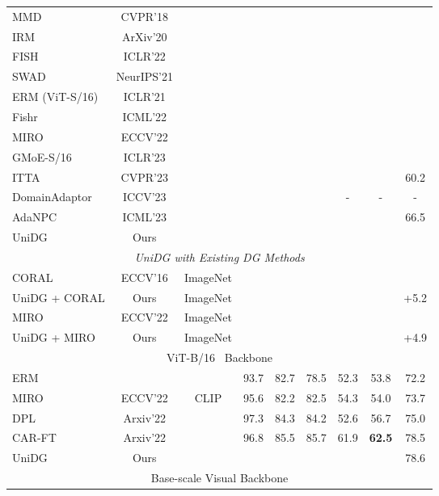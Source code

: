 \documentclass{article} \usepackage{iclr2024_conference,times}
\def\Model{UniDG }
\begin{document}
\begin{table*}[t]
{\begin{tabular}{l|c|c|cccccc}
			MMD~\citep{li2018domain} & CVPR'18 & &  &  &  &  &   &  \\
			IRM ~\citep{arjovsky2019invariant} & ArXiv'20 &  &  &  &  &  &   &  \\
			FISH~\citep{shi2021gradient} & ICLR'22 &  &  &  &  &  &  &  \\
			SWAD~\citep{cha2021swad} & NeurIPS'21 &  &  &  &  &  &   &   \\
			ERM (ViT-S/16)~\citep{dosovitskiy2020image} & ICLR'21 &  &  &  &  &  &   &  \\
			Fishr~\citep{rame2022fishr} & ICML'22&  &  &  &  &  &  &  \\
			MIRO\citep{cha2022domain} & ECCV'22 &  &  &  &  &  &  &  \\
			GMoE-S/16~\citep{li2022sparse} & ICLR'23 &  &  &  &  &  &  &  \\ 
                ITTA~\citep{chen2023improved} & CVPR'23 & &   &  &  &  &  & 60.2 \\
                DomainAdaptor~\citep{zhang2023domainadaptor} & ICCV'23 & &  &  &  & - & - & - \\ 
                AdaNPC~\citep{zhang2023adanpc} & ICML'23 &  &  &  &  &   &   & 66.5 \\
			\rowcolor{mygray}
                \Model & Ours & &   
			&                &               &          &   &  \\
			\midrule 
                \multicolumn{9}{c}{ \textit{UniDG with Existing DG Methods} } \\ \hline
                CORAL~\citep{sun2016deep} & ECCV'16 & {ImageNet} &  &  &  &  &   &   \\ 
                \rowcolor{mygray}
                \Model + CORAL &Ours & {ImageNet} &   
			&                &               &          &   &  \textcolor{mygreen}{+5.2} \\ \hline 
                MIRO\citep{cha2022domain} & ECCV'22 &  {ImageNet} &  &  &  &  &  &  \\ 
                \rowcolor{mygray}
                \Model + MIRO & Ours &  {ImageNet} &  &  &  &  &  &  \textcolor{mygreen}{+4.9} \\ 
                \midrule
			\multicolumn{9}{c}{ViT-B/16~\citep{dosovitskiy2020image} Backbone} \\ \hline
			ERM~\citep{vapnik1991principles}  & & & 93.7 & 82.7 & 78.5 & 52.3 & 53.8 & 72.2 \\
			MIRO~\citep{cha2022domain} & ECCV'22 & \multirow{3}{*}{CLIP}& 95.6 & 82.2 & 82.5 & 54.3 & 54.0 & 73.7 \\
			DPL~\citep{zhang2021domain} & Arxiv'22 &   & 97.3 & 84.3 & 84.2 & 52.6 & 56.7 & 75.0 \\ 
			CAR-FT~\citep{mao2022context} & Arxiv'22 &   & 96.8 & 85.5 & 85.7 & 61.9 & \textbf{62.5} & 78.5 \\ \hline
                \rowcolor{mygray}
                UniDG & Ours &  &  &  &  &  &  & 78.6  \\ \hline
			\multicolumn{9}{c}{Base-scale Visual Backbone} \\ \hline
			

\end{tabular}}
\end{table*}
\end{document}
